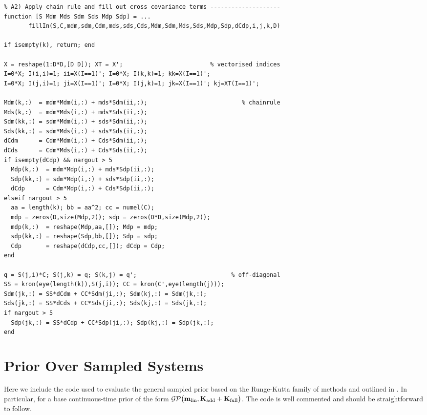 \begin{lstlisting}
% A2) Apply chain rule and fill out cross covariance terms --------------------
function [S Mdm Mds Sdm Sds Mdp Sdp] = ...
       fillIn(S,C,mdm,sdm,Cdm,mds,sds,Cds,Mdm,Sdm,Mds,Sds,Mdp,Sdp,dCdp,i,j,k,D)

if isempty(k), return; end

X = reshape(1:D*D,[D D]); XT = X';                         % vectorised indices
I=0*X; I(i,i)=1; ii=X(I==1)'; I=0*X; I(k,k)=1; kk=X(I==1)';
I=0*X; I(j,i)=1; ji=X(I==1)'; I=0*X; I(j,k)=1; jk=X(I==1)'; kj=XT(I==1)';

Mdm(k,:)  = mdm*Mdm(i,:) + mds*Sdm(ii,:);                           % chainrule
Mds(k,:)  = mdm*Mds(i,:) + mds*Sds(ii,:);
Sdm(kk,:) = sdm*Mdm(i,:) + sds*Sdm(ii,:);
Sds(kk,:) = sdm*Mds(i,:) + sds*Sds(ii,:);
dCdm      = Cdm*Mdm(i,:) + Cds*Sdm(ii,:);
dCds      = Cdm*Mds(i,:) + Cds*Sds(ii,:);
if isempty(dCdp) && nargout > 5
  Mdp(k,:)  = mdm*Mdp(i,:) + mds*Sdp(ii,:);
  Sdp(kk,:) = sdm*Mdp(i,:) + sds*Sdp(ii,:);
  dCdp      = Cdm*Mdp(i,:) + Cds*Sdp(ii,:);
elseif nargout > 5
  aa = length(k); bb = aa^2; cc = numel(C);
  mdp = zeros(D,size(Mdp,2)); sdp = zeros(D*D,size(Mdp,2));
  mdp(k,:)  = reshape(Mdp,aa,[]); Mdp = mdp;
  sdp(kk,:) = reshape(Sdp,bb,[]); Sdp = sdp;
  Cdp       = reshape(dCdp,cc,[]); dCdp = Cdp;
end

q = S(j,i)*C; S(j,k) = q; S(k,j) = q';                           % off-diagonal
SS = kron(eye(length(k)),S(j,i)); CC = kron(C',eye(length(j)));
Sdm(jk,:) = SS*dCdm + CC*Sdm(ji,:); Sdm(kj,:) = Sdm(jk,:);
Sds(jk,:) = SS*dCds + CC*Sds(ji,:); Sds(kj,:) = Sds(jk,:);
if nargout > 5
  Sdp(jk,:) = SS*dCdp + CC*Sdp(ji,:); Sdp(kj,:) = Sdp(jk,:);
end

\end{lstlisting}




\section{Prior Over Sampled Systems} \label{app:codePrior}


Here we include the code used to evaluate the general sampled prior based on the Runge-Kutta family of methods and outlined in . In particular, for a base continuous-time prior of the form $\mathcal{GP}\big(\mathbf{m}_{\text{lin}}, \mathbf{K}_{\text{add}} + \mathbf{K}_{\text{full}} \big)$. The code is well commented and should be straightforward to follow.


